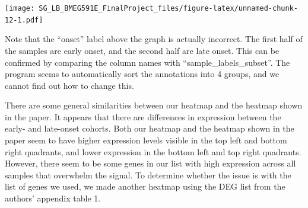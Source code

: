 \documentclass[
]{article}
\newenvironment{Shaded}{\begin{snugshade}}{\end{snugshade}}
\newcommand{\AttributeTok}[1]{\textcolor[rgb]{0.77,0.63,0.00}{#1}}
\newcommand{\CommentTok}[1]{\textcolor[rgb]{0.56,0.35,0.01}{\textit{#1}}}
\newcommand{\ConstantTok}[1]{\textcolor[rgb]{0.00,0.00,0.00}{#1}}
\newcommand{\DecValTok}[1]{\textcolor[rgb]{0.00,0.00,0.81}{#1}}
\newcommand{\FloatTok}[1]{\textcolor[rgb]{0.00,0.00,0.81}{#1}}
\newcommand{\FunctionTok}[1]{\textcolor[rgb]{0.00,0.00,0.00}{#1}}
\newcommand{\NormalTok}[1]{#1}
\newcommand{\OtherTok}[1]{\textcolor[rgb]{0.56,0.35,0.01}{#1}}
\newcommand{\SpecialCharTok}[1]{\textcolor[rgb]{0.00,0.00,0.00}{#1}}
\newcommand{\StringTok}[1]{\textcolor[rgb]{0.31,0.60,0.02}{#1}}
\begin{document}
\texttt{[image: SG\_LB\_BMEG591E\_FinalProject\_files/figure-latex/unnamed-chunk-12-1.pdf]}

\begin{Shaded}
\end{Shaded}

Note that the ``onset'' label above the graph is actually incorrect. The
first half of the samples are early onset, and the second half are late
onset. This can be confirmed by comparing the column names with
``sample\_labels\_subset''. The program seems to automatically sort the
annotations into 4 groups, and we cannot find out how to change this.

There are some general similarities between our heatmap and the heatmap
shown in the paper. It appears that there are differences in expression
between the early- and late-onset cohorts. Both our heatmap and the
heatmap shown in the paper seem to have higher expression levels visible
in the top left and bottom right quadrants, and lower expression in the
bottom left and top right quadrants. However, there seem to be some
genes in our list with high expression across all samples that overwhelm
the signal. To determine whether the issue is with the list of genes we
used, we made another heatmap using the DEG list from the authors'
appendix table 1.
\end{document}

